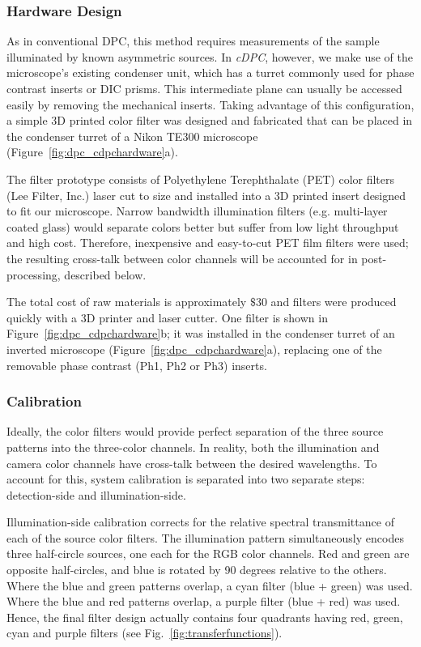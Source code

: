 \subsubsection{Hardware Design}
As in conventional DPC, this method requires measurements of the sample illuminated by known asymmetric sources. In \textit{cDPC}, however, we make use of the microscope's existing condenser unit, which has a turret commonly used for phase contrast inserts or DIC prisms. This intermediate plane can usually be accessed easily by removing the mechanical inserts. Taking advantage of this configuration, a simple 3D printed color filter was designed and fabricated that can be placed in the condenser turret of a Nikon TE300 microscope (Figure~\ref{fig:dpc_cdpchardware}a).

The filter prototype consists of Polyethylene Terephthalate (PET) color filters (Lee Filter, Inc.) laser cut to size and installed into a 3D printed insert designed to fit our microscope. Narrow bandwidth illumination filters (e.g. multi-layer coated glass) would separate colors better but suffer from low light throughput and high cost. Therefore, inexpensive and easy-to-cut PET film filters were used; the resulting cross-talk between color channels will be accounted for in post-processing, described below.

The total cost of raw materials is approximately $\$30$ and filters were produced quickly with a 3D printer and laser cutter. One filter is shown in Figure~\ref{fig:dpc_cdpchardware}b; it was installed in the condenser turret of an inverted microscope (Figure~\ref{fig:dpc_cdpchardware}a), replacing one of the removable phase contrast (Ph1, Ph2 or Ph3) inserts.
\subsubsection{Calibration}
\label{Calibration}

Ideally, the color filters would provide perfect separation of the three source patterns into the three-color channels. In reality, both the illumination and camera color channels have cross-talk between the desired wavelengths. To account for this, system calibration is separated into two separate steps: detection-side and illumination-side.

Illumination-side calibration corrects for the relative spectral transmittance of each of the source color filters. The illumination pattern simultaneously encodes three half-circle sources, one each for the RGB color channels. Red and green are opposite half-circles, and blue is rotated by 90 degrees relative to the others. Where the blue and green patterns overlap, a cyan filter (blue + green) was used. Where the blue and red patterns overlap, a purple filter (blue + red) was used. Hence, the final filter design actually contains four quadrants having red, green, cyan and purple filters (see Fig.~\ref{fig:transferfunctions}).

